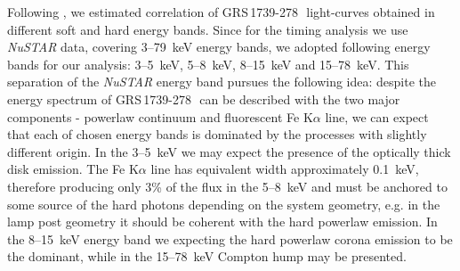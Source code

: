 \documentclass[a4paper,fleqn,usenatbib]{mnras}
\def\grs{{GRS\,1739-278\,}}
\begin{document}

Following \citep{1997ApJ...474L..43V}, we estimated correlation of \grs\ light-curves obtained in different soft and hard energy bands. 
Since for the timing analysis we use {\it NuSTAR} data, covering 3--79~keV energy bands, we adopted following energy bands for our analysis: 3--5~keV, 5--8~keV, 8--15~keV and 15--78~keV.
This separation of the {\it NuSTAR} energy band pursues the following idea: despite the energy spectrum of \grs\ can be described with the two major components - powerlaw continuum and fluorescent Fe K$\alpha$ line, we can expect that each of chosen energy bands is dominated by the processes with slightly different origin. 
In the 3--5~keV we may expect the presence of the optically thick disk emission. 
The Fe K$\alpha$ line has equivalent width approximately 0.1~keV, therefore producing only 3\% of the flux in the 5--8~keV and must be anchored to some source of the hard photons depending on the system geometry, e.g. in the lamp post geometry it should be coherent with the hard powerlaw emission. 
In the 8--15~keV energy band we expecting the hard powerlaw corona emission to be the dominant, while in the 15--78~keV Compton hump may be presented.


\end{document}
